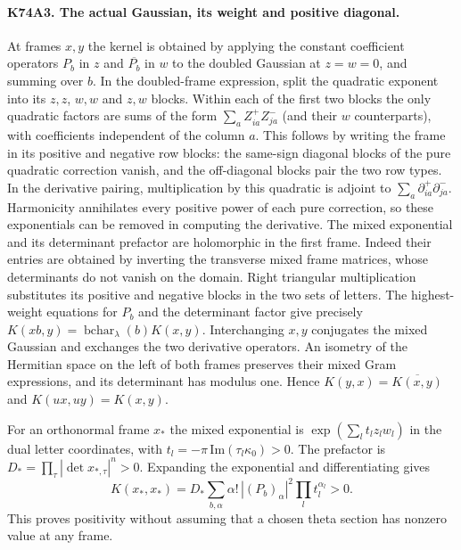 \paragraph{K74A3. The actual Gaussian, its weight and positive diagonal.}
At frames $x,y$ the kernel is obtained by applying the constant
coefficient operators $P_b$ in $z$ and $\overline{P_b}$ in $w$
to the doubled Gaussian at $z=w=0$, and summing over $b$. In the
doubled-frame expression, split the quadratic exponent into its
$z,z$, $w,w$ and $z,w$ blocks. Within each of the first two blocks
the only quadratic factors are sums of the form
$\sum_a Z^+_{ia}Z^-_{ja}$ (and their $w$ counterparts), with
coefficients independent of the column $a$. This follows by writing
the frame in its positive and negative row blocks: the same-sign
diagonal blocks of the pure quadratic correction vanish, and the
off-diagonal blocks pair the two row types. In the derivative pairing,
multiplication by this quadratic is adjoint to
$\sum_a\partial^+_{ia}\partial^-_{ja}$. Harmonicity annihilates
every positive power of each pure correction, so these exponentials
can be removed in computing the derivative. The mixed exponential
and its determinant prefactor are holomorphic in the first frame.
Indeed their entries are obtained by inverting the transverse
mixed frame matrices, whose determinants do not vanish on the
domain. Right triangular multiplication substitutes its positive
and negative blocks in the two sets of letters. The highest-weight
equations for $P_b$ and the determinant factor give precisely
$K(xb,y)=\operatorname{bchar}_\lambda(b)K(x,y)$.
Interchanging $x,y$ conjugates the mixed Gaussian and exchanges the
two derivative operators. An isometry of the Hermitian space on
the left of both frames preserves their mixed Gram expressions,
and its determinant has modulus one. Hence
$K(y,x)=\overline{K(x,y)}$ and $K(ux,uy)=K(x,y)$.

For an orthonormal frame $x_*$ the mixed exponential is
$\exp(\sum_l t_l z_l w_l)$ in the dual letter coordinates, with
$t_l=-\pi\,\mathrm{Im}(\tau_l\kappa_0)>0$. The prefactor is
$D_* =\prod_\tau |\det x_{*,\tau}|^n>0$. Expanding the
exponential and differentiating gives
\[
      K(x_*,x_*)=
        D_*\sum_{b,\alpha}\alpha!\,
           |(P_b)_\alpha|^2\prod_l t_l^{\alpha_l}>0 .
\]
This proves positivity without assuming that a chosen theta section
has nonzero value at any frame.


